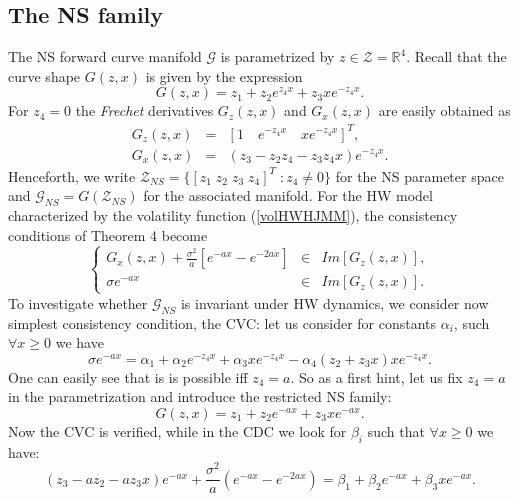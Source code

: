 \subsection{The NS family}
The NS forward curve manifold $\mathcal{G}$ is parametrized by $z\in
\mathcal{Z}=\mathbb{R}^4$. Recall that the curve shape $G(z, x)$ is
given by the expression
\begin{equation}
\label{NSspec}
G(z,x)=z_1+z_2 e^{z_4 x}+z_3 x e^{-z_4 x}.
\end{equation}
For $z_4=0$ the {\sl Frechet} derivatives $G_z(z,x)$ and $G_x(z,x)$
are easily obtained as
\begin{equation}
\label{rcl}
\begin{array}{rcl}
G_z(z,x) &=& [1\quad e^{-z_4 x}\quad xe^{-z_4 x}]^T,\\
G_x(z,x) &=& (z_3-z_2 z_4 -z_3 z_4 x)e^{-z_4 x}.
\end{array}
\end{equation}
Henceforth, we write $\mathcal{Z}_{NS}=\{ [z_1\; z_2\; z_3\; z_4]^T\;
: z_4\neq 0\}$ for the NS parameter space and
$\mathcal{G}_{NS}=G(\mathcal{Z}_{NS})$ for the associated
manifold. For the HW model characterized by the volatility function
(\ref{volHWHJMM}), the consistency conditions of Theorem 4 become
\begin{equation}
\left\{
\begin{array}{rcl}
G_x(z,x)+\frac{\sigma^2}{a}\left[ e^{-a x}-e^{-2 a x}\right] & \in &
Im[ G_z(z,x) ], \\
\sigma e^{-a x} & \in & Im[ G_z(z,x) ].
\end{array}
\right.
\end{equation}
To investigate whether $\mathcal{G}_{NS}$ is invariant under HW
dynamics, we consider now simplest consistency condition, the CVC: let
us consider for constants $\alpha_i$, such $\forall x\geq 0$ we have  
\begin{equation}
\label{NSCVC}
\sigma e^{-a x}=\alpha_1 + \alpha_2 e^{-z_4 x}+\alpha_3 x e^{-z_4
  x}-\alpha_4 (z_2+ z_3 x) x e^{-z_4 x}.
\end{equation}
One can easily see that is is possible iff $z_4=a$. So as a first
hint, let us fix $z_4=a$ in the parametrization and introduce the
restricted NS family: 
$$
G(z,x)= z_1+z_2 e^{-a x} + z_3 x e^{-a x}.
$$
Now the CVC is verified, while in the CDC we look for $\beta_i$ such
that $\forall x\geq 0$ we have:
\begin{equation}
\label{restricNSCDC}
(z_3-a z_2 -a z_3 x) e^{- a x}+\frac{\sigma^2}{a}\left(e^{-a x}-e^{-2
    a x}\right)=\beta_1+\beta_2 e^{-a x}+ \beta_3 x e^{-a x}.
\end{equation}
